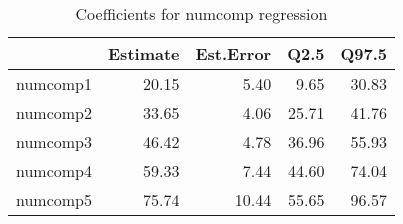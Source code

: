 \begin{table}[ht]
\centering
\begin{tabular}{rrrrr}
  \hline
 & Estimate & Est.Error & Q2.5 & Q97.5 \\ 
  \hline
numcomp1 & 20.15 & 5.40 & 9.65 & 30.83 \\ 
  numcomp2 & 33.65 & 4.06 & 25.71 & 41.76 \\ 
  numcomp3 & 46.42 & 4.78 & 36.96 & 55.93 \\ 
  numcomp4 & 59.33 & 7.44 & 44.60 & 74.04 \\ 
  numcomp5 & 75.74 & 10.44 & 55.65 & 96.57 \\ 
   \hline
\end{tabular}
\caption{Coefficients for numcomp regression} 
\end{table}
